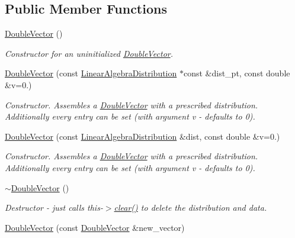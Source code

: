 \subsection*{Public Member Functions}
\begin{DoxyCompactItemize}
\item 
\hyperlink{classoomph_1_1DoubleVector_a786d26f4034f2ae10c9d26542642661f}{Double\+Vector} ()
\begin{DoxyCompactList}\small\item\em Constructor for an uninitialized \hyperlink{classoomph_1_1DoubleVector}{Double\+Vector}. \end{DoxyCompactList}\item 
\hyperlink{classoomph_1_1DoubleVector_a21f824524cd7bc779af3cbdbfe1d3ef8}{Double\+Vector} (const \hyperlink{classoomph_1_1LinearAlgebraDistribution}{Linear\+Algebra\+Distribution} $\ast$const \&dist\+\_\+pt, const double \&v=0.)
\begin{DoxyCompactList}\small\item\em Constructor. Assembles a \hyperlink{classoomph_1_1DoubleVector}{Double\+Vector} with a prescribed distribution. Additionally every entry can be set (with argument v -\/ defaults to 0). \end{DoxyCompactList}\item 
\hyperlink{classoomph_1_1DoubleVector_a29d22a13eeaa61d5467d5cfa37e1f38f}{Double\+Vector} (const \hyperlink{classoomph_1_1LinearAlgebraDistribution}{Linear\+Algebra\+Distribution} \&dist, const double \&v=0.)
\begin{DoxyCompactList}\small\item\em Constructor. Assembles a \hyperlink{classoomph_1_1DoubleVector}{Double\+Vector} with a prescribed distribution. Additionally every entry can be set (with argument v -\/ defaults to 0). \end{DoxyCompactList}\item 
\hyperlink{classoomph_1_1DoubleVector_a53441aa63f3acfa65dc4556ffa0b5573}{$\sim$\+Double\+Vector} ()
\begin{DoxyCompactList}\small\item\em Destructor -\/ just calls this-\/$>$\hyperlink{classoomph_1_1DoubleVector_af1677445056759263b1b076966e7bfae}{clear()} to delete the distribution and data. \end{DoxyCompactList}\item 
\hyperlink{classoomph_1_1DoubleVector_af547ee3b90c4a5598b655ed57ed78b2f}{Double\+Vector} (const \hyperlink{classoomph_1_1DoubleVector}{Double\+Vector} \&new\+\_\+vector)

\end{DoxyCompactItemize}
